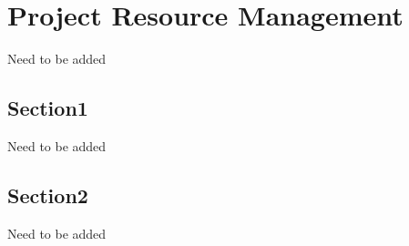 \chapter{Project Resource Management}
Need to be added
\section{Section1}
Need to be added
\section{Section2}
Need to be added

\FloatBarrier
\newpage